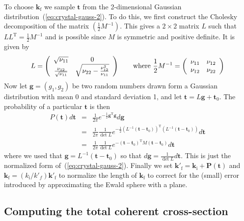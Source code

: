 To choose $\boldsymbol{k}_\textrm{f}$ we sample $\boldsymbol{t}$ from the
2-dimensional Gaussian distribution~(\ref{eq:crystal-gauss-2}). To do
this, we first construct the Cholesky decomposition of the matrix
$(\frac{1}{2}M^{-1})$. This gives a $2\times 2$ matrix $L$ such that $L
L^\textrm{T} = \frac{1}{2}M^{-1}$ and is possible since $M$ is symmetric
and positive definite. It is given by
$$
  L = \left(
  \begin{array}[c]{cc}
    \sqrt{\nu_{11}} & 0 \\
    \frac{\nu_{12}}{\sqrt{\nu_{11}}} & \sqrt{\nu_{22} - \frac{\nu_{12}^2}{\nu_{11}}}
  \end{array}\right)
\qquad\hbox{where }
  \frac{1}{2}M^{-1} = \left(
  \begin{array}[c]{cc}
    \nu_{11} & \nu_{12} \\
    \nu_{12} & \nu_{22}
  \end{array}\right)
$$
Now let $\boldsymbol{g} = (g_1, g_2)$ be two random numbers drawn form a
Gaussian distribution with mean 0 and standard deviation 1, and let
$\boldsymbol{t} = L\boldsymbol{g} + \boldsymbol{t}_0$. The probability
of a particular $\boldsymbol{t}$ is then
\begin{eqnarray}
  P(\boldsymbol{t})d\boldsymbol{t}
    &=& \frac{1}{2\pi}
      e^{-\frac{1}{2}\boldsymbol{g}^\textrm{T}\boldsymbol{g}} d\boldsymbol{g} \\
    &=& \frac{1}{2\pi}\frac{1}{\det L}
      e^{-\frac{1}{2}(L^{-1}(\boldsymbol{t}-\boldsymbol{t}_0))^\textrm{T}
          (L^{-1}(\boldsymbol{t}-\boldsymbol{t}_0))} d\boldsymbol{t} \\
    &=& \frac{1}{2\pi}\frac{1}{\det L}
      e^{-(\boldsymbol{t}-\boldsymbol{t}_0)^\textrm{T}
          M(\boldsymbol{t}-\boldsymbol{t}_0)} d\boldsymbol{t}
  \label{eq:crystal-gauss-prob-1}
\end{eqnarray}
where we used that
$\boldsymbol{g}=L^{-1}(\boldsymbol{t}-\boldsymbol{t}_0)$ so that
$d\boldsymbol{g} = \frac{1}{\det L}d\boldsymbol{t}$. This is just the
normalized form of~(\ref{eq:crystal-gauss-2}). Finally we set
$\boldsymbol{k}'_\textrm{f} = \boldsymbol{k}_\textrm{i} +
\boldsymbol{P}(\boldsymbol{t})$ and
$\boldsymbol{k}_\textrm{f} = (k_\textrm{i}/k'_f)\boldsymbol{k}'_\textrm{f}$ to
normalize the length of $\boldsymbol{k}_\textrm{f}$ to correct for the
(small) error introduced by approximating the Ewald sphere with a plane.

\subsection{Computing the total coherent cross-section}

